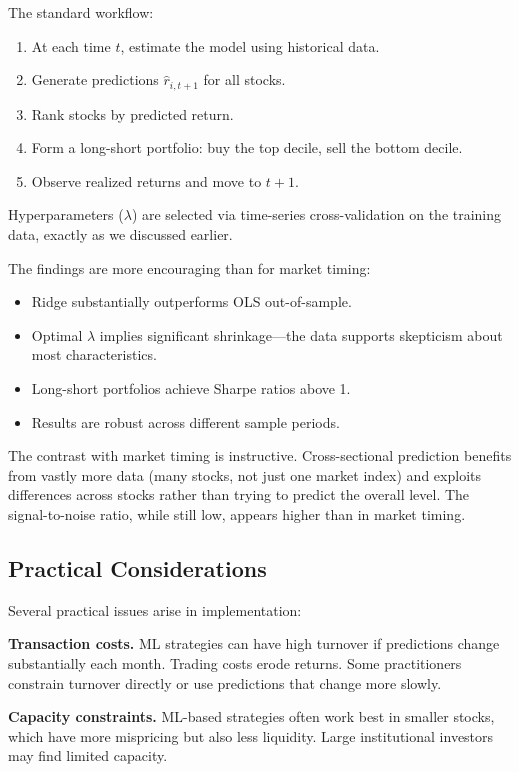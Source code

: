 \documentclass[11pt,a4paper]{article}
\begin{document}
The standard workflow:
\begin{enumerate}
    \item At each time $t$, estimate the model using historical data.
    \item Generate predictions $\widehat{r}_{i,t+1}$ for all stocks.
    \item Rank stocks by predicted return.
    \item Form a long-short portfolio: buy the top decile, sell the bottom decile.
    \item Observe realized returns and move to $t+1$.
\end{enumerate}

Hyperparameters ($\lambda$) are selected via time-series cross-validation on the training data, exactly as we discussed earlier.

The findings are more encouraging than for market timing:
\begin{itemize}
    \item Ridge substantially outperforms OLS out-of-sample.
    \item Optimal $\lambda$ implies significant shrinkage---the data supports skepticism about most characteristics.
    \item Long-short portfolios achieve Sharpe ratios above 1.
    \item Results are robust across different sample periods.
\end{itemize}

The contrast with market timing is instructive. Cross-sectional prediction benefits from vastly more data (many stocks, not just one market index) and exploits differences across stocks rather than trying to predict the overall level. The signal-to-noise ratio, while still low, appears higher than in market timing.

\subsection{Practical Considerations}

Several practical issues arise in implementation:

\textbf{Transaction costs.} ML strategies can have high turnover if predictions change substantially each month. Trading costs erode returns. Some practitioners constrain turnover directly or use predictions that change more slowly.

\textbf{Capacity constraints.} ML-based strategies often work best in smaller stocks, which have more mispricing but also less liquidity. Large institutional investors may find limited capacity.
\end{document}
